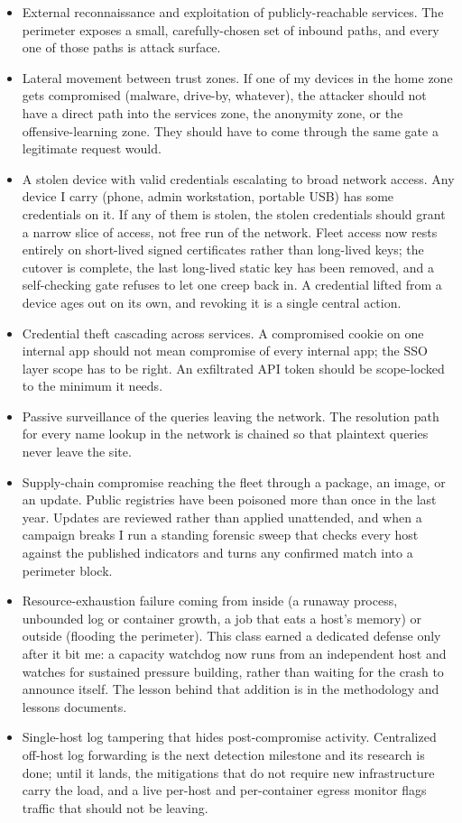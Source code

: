 \documentclass[12pt]{article}
\begin{document}
\begin{itemize}[leftmargin=18pt,itemsep=2pt]
  \item External reconnaissance and exploitation of publicly-reachable services. The perimeter exposes a small, carefully-chosen set of inbound paths, and every one of those paths is attack surface.
  \item Lateral movement between trust zones. If one of my devices in the home zone gets compromised (malware, drive-by, whatever), the attacker should not have a direct path into the services zone, the anonymity zone, or the offensive-learning zone. They should have to come through the same gate a legitimate request would.
  \item A stolen device with valid credentials escalating to broad network access. Any device I carry (phone, admin workstation, portable USB) has some credentials on it. If any of them is stolen, the stolen credentials should grant a narrow slice of access, not free run of the network. Fleet access now rests entirely on short-lived signed certificates rather than long-lived keys; the cutover is complete, the last long-lived static key has been removed, and a self-checking gate refuses to let one creep back in. A credential lifted from a device ages out on its own, and revoking it is a single central action.
  \item Credential theft cascading across services. A compromised cookie on one internal app should not mean compromise of every internal app; the SSO layer scope has to be right. An exfiltrated API token should be scope-locked to the minimum it needs.
  \item Passive surveillance of the queries leaving the network. The resolution path for every name lookup in the network is chained so that plaintext queries never leave the site.
  \item Supply-chain compromise reaching the fleet through a package, an image, or an update. Public registries have been poisoned more than once in the last year. Updates are reviewed rather than applied unattended, and when a campaign breaks I run a standing forensic sweep that checks every host against the published indicators and turns any confirmed match into a perimeter block.
  \item Resource-exhaustion failure coming from inside (a runaway process, unbounded log or container growth, a job that eats a host's memory) or outside (flooding the perimeter). This class earned a dedicated defense only after it bit me: a capacity watchdog now runs from an independent host and watches for sustained pressure building, rather than waiting for the crash to announce itself. The lesson behind that addition is in the methodology and lessons documents.
  \item Single-host log tampering that hides post-compromise activity. Centralized off-host log forwarding is the next detection milestone and its research is done; until it lands, the mitigations that do not require new infrastructure carry the load, and a live per-host and per-container egress monitor flags traffic that should not be leaving.
\end{itemize}
\end{document}
